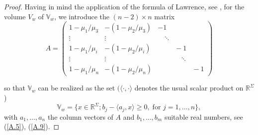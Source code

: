 \documentclass[12pt,leqno]{article}
\def\IR{{\mathbb R}}
\def\IV{{\mathbb V}}
\def\n{\noindent}
\begin{document}
\begin{appendix}
\begin{proof}
\medskip
Having in mind the application of the formula of Lawrence, see \cite{Lawr91}, for the volume $V_w$ of $\IV_w$, we introduce the $(n-2) \times n$ matrix
\begin{equation}\label{A.26}
A =  \begin{pmatrix}
1 - \mu_1/\mu_3 & -(1-\mu_2/\mu_3) & -1
\\
\vdots & \vdots &\quad  \ddots
\\
1 - \mu_1/\mu_i & -(1-\mu_2/\mu_i)&&\!\!\! -1
\\
\vdots & \vdots & &\quad \ddots
\\
1 - \mu_1/\mu_n& -(1-\mu_2/\mu_n)& && \!\!\!-1
\end{pmatrix}
\end{equation}

\medskip\n
so that $\IV_w$ can be realized as the set $(\langle \cdot, \cdot \rangle$ denotes the usual scalar product on $\IR^\Sigma$)
\begin{equation}\label{A.27}
\IV_w = \{x \in \IR^\Sigma; b_j - \langle a_j,x\rangle \ge 0, \; \mbox{for $j = 1,\dots, n\}$},
\end{equation}
with $a_1,\dots,a_n$ the column vectors of $A$ and $b_1,\dots,b_m$ suitable real numbers, see (\ref{A.5}), (\ref{A.9}).


\end{proof}
\end{appendix}
\end{document}
